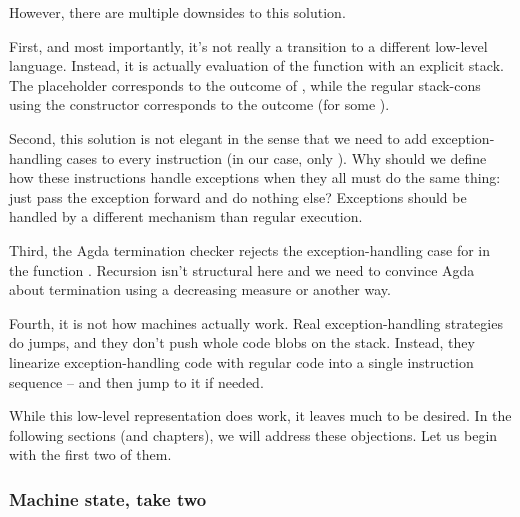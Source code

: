 \noindent However, there are multiple downsides to this solution.

First, and most importantly, it's not really a transition to a different low-level language.
Instead, it is actually evaluation of the function  with an explicit
stack. The placeholder \ident{\void} corresponds to the outcome  of
, while the regular stack-cons using the constructor \ident{\scons\!\!}
corresponds to the outcome  (for some ).

Second, this solution is not elegant in the sense that we need to add exception-handling
cases to every instruction (in our case, only ). Why should we define how
these instructions handle exceptions when they all must do the same thing: just pass
the exception forward and do nothing else? Exceptions should be handled by a different
mechanism than regular execution.

Third, the Agda termination checker rejects the exception-handling case for
 in the function . Recursion isn't structural
here and we need to convince Agda about termination using a decreasing measure
or another way.

Fourth, it is not how machines actually work. Real exception-handling strategies do jumps,
and they don't push whole code blobs on the stack. Instead, they linearize exception-handling
code with regular code into a single instruction sequence -- and then jump to it if needed.

While this low-level representation does work, it leaves much to be desired. In the following
sections (and chapters), we will address these objections. Let us begin with the first two
of them.

\subsubsection{Machine state, take two}


